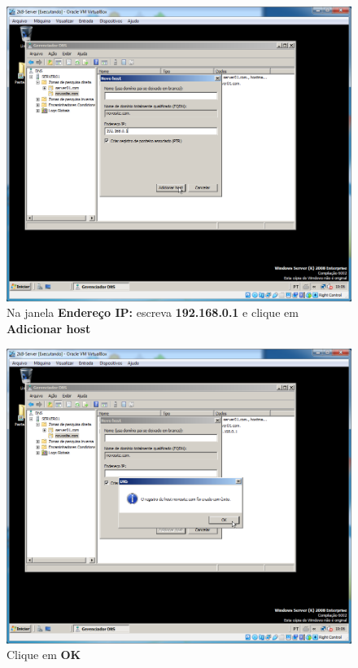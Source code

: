 \documentclass[10pt]{article}
\begin{document}
\begin{figure}[H]
    \centering
    \caption{Na janela \textbf{Endereço IP:} escreva \textbf{192.168.0.1} e clique em \textbf{Adicionar host}}
    \label{fig:5532011}
    \includegraphics[width=\linewidth]{images/IIS/criando_um_novo_site/011.png}
\end{figure}
\begin{figure}[H]
    \centering
    \caption{Clique em \textbf{OK}}
    \label{fig:5532012}
    \includegraphics[width=\linewidth]{images/IIS/criando_um_novo_site/012.png}
\end{figure}
\end{document}
